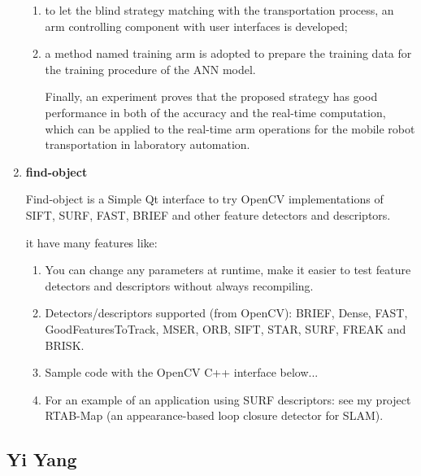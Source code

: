 \documentclass[paper=a4, fontsize=11pt]{scrartcl} %
\numberwithin{equation}{section} %
\numberwithin{figure}{section} %
\numberwithin{table}{section} %
\begin{document}
\begin{enumerate}
\begin{enumerate}
\item to let the blind strategy matching with the transportation process, an arm controlling component with
user interfaces is developed;

\item a method named training arm is adopted to prepare the training data for the training procedure of the ANN model.

Finally, an experiment proves that the proposed strategy has good performance in both of the accuracy and the real-time computation, which can be applied to the real-time arm operations for the mobile robot transportation in laboratory automation.

\end{enumerate}

\item \textbf{find-object}
 
Find-object is a Simple Qt interface to try OpenCV implementations of SIFT, SURF, FAST, BRIEF and other feature detectors and descriptors.

it have many features like:

\begin{enumerate}
\item You can change any parameters at runtime, make it easier to test feature detectors and descriptors without always recompiling.

\item Detectors/descriptors supported (from OpenCV): BRIEF, Dense, FAST, GoodFeaturesToTrack, MSER, ORB, SIFT, STAR, SURF, FREAK and BRISK.

\item Sample code with the OpenCV C++ interface below...

\item For an example of an application using SURF descriptors: see my project RTAB-Map (an appearance-based loop closure detector for SLAM).
\end{enumerate}

\end{enumerate}

\subsection{Yi Yang}
\end{document}
